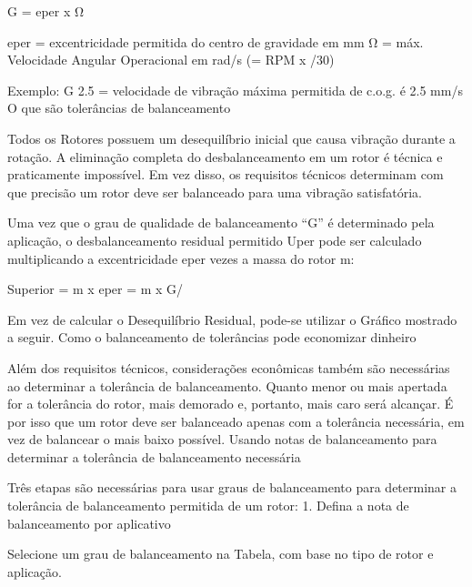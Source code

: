 \documentclass[a4paper]{book}
\begin{document}
G = eper x Ω

eper = excentricidade permitida do centro de gravidade em mm
Ω = máx. Velocidade Angular Operacional em rad/s (\Omega = RPM x \pi/30)

Exemplo: G 2.5 = velocidade de vibração máxima permitida de c.o.g. é 2.5 mm/s
O que são tolerâncias de balanceamento

Todos os Rotores possuem um desequilíbrio inicial que causa vibração durante a rotação. A eliminação completa do desbalanceamento em um rotor é técnica e praticamente impossível. Em vez disso, os requisitos técnicos determinam com que precisão um rotor deve ser balanceado para uma vibração satisfatória.

Uma vez que o grau de qualidade de balanceamento “G” é determinado pela aplicação, o desbalanceamento residual permitido Uper pode ser calculado multiplicando a excentricidade eper vezes a massa do rotor m:

Superior = m x eper = m x G/\Omega

Em vez de calcular o Desequilíbrio Residual, pode-se utilizar o Gráfico mostrado a seguir.
Como o balanceamento de tolerâncias pode economizar dinheiro

Além dos requisitos técnicos, considerações econômicas também são necessárias ao determinar a tolerância de balanceamento. Quanto menor ou mais apertada for a tolerância do rotor, mais demorado e, portanto, mais caro será alcançar. É por isso que um rotor deve ser balanceado apenas com a tolerância necessária, em vez de balancear o mais baixo possível.
Usando notas de balanceamento para determinar a tolerância de balanceamento necessária

Três etapas são necessárias para usar graus de balanceamento para determinar a tolerância de balanceamento permitida de um rotor:
1. Defina a nota de balanceamento por aplicativo

Selecione um grau de balanceamento na Tabela, com base no tipo de rotor e aplicação.
\end{document}

